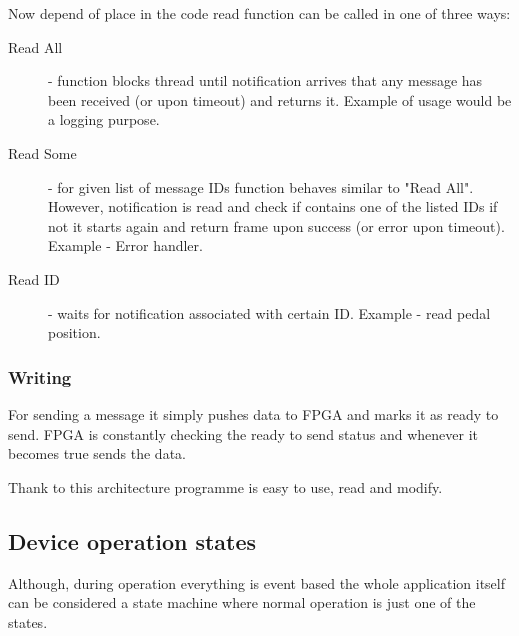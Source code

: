 Now depend of place in the code read function can be called in one of three ways:
\begin{description}
    \item[Read All] - function blocks thread until notification arrives that any message has been received (or upon timeout) and returns it. Example of usage would be a logging purpose.
    \item[Read Some] - for given list of message IDs function behaves similar to "Read All". However, notification is read and check if contains one of the listed IDs if not it starts again and return frame upon success (or error upon timeout). Example - Error handler.
    \item[Read ID] - waits for notification associated with certain ID. Example - read pedal position.
    
    


\end{description}

\subsubsection{Writing}
For sending a message it simply pushes data to FPGA and marks it as ready to send. FPGA is constantly checking the ready to send status and whenever it becomes true sends the data.


Thank to this architecture programme is easy to use, read and modify.

\subsection{Device operation states}
Although, during operation everything is event based the whole application itself can be considered a state machine where normal operation is just one of the states.


